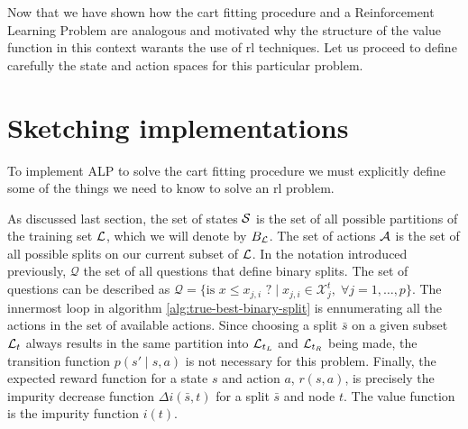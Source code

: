 
Now that we have shown how the \ac{cart} fitting procedure and a Reinforcement
Learning Problem are analogous and motivated why the structure of the value
function in this context warants the use of \ac{rl} techniques. Let us proceed
to define carefully the state and action spaces for this particular problem.

\section{Sketching implementations}

To implement ALP to solve the \ac{cart} fitting procedure we must explicitly
define some of the things we need to know to solve an \ac{rl} problem.

As discussed last section, the set of states $\mathcal{S}$ is the set of all
possible partitions of the training set $\mathcal{L}$, which we will denote by $B_{\mathcal{L}}$.
The set of actions $\mathcal{A}$ is the set of all possible splits on our current
subset of $\mathcal{L}$. In the notation introduced previously, $\mathcal{Q}$ the set of
all questions that define binary splits. The set of questions can be described
as $\mathcal{Q} = \{ \text{is } x \leq x_{j, i} \text{ ?} \mid x_{j, i} \in
\mathcal{X}_{j}^{t}, \; \forall j = 1, \dots, p \}$.  The innermost loop in
algorithm \ref{alg:true-best-binary-split} is ennumerating all the actions in
the set of available actions. Since choosing a split $\bar{s}$ on a given subset
$\mathcal{L}_t$ always results in the same partition into $\mathcal{L}_{t_L}$ and $\mathcal{L}_{t_R}$ being
made, the transition function $p(s' \mid s, a)$ is not necessary for this
problem. Finally, the expected reward function for a state $s$ and action $a$,
$r(s, a)$, is precisely the impurity decrease function $\Delta i(\bar{s}, t)$
for a split $\bar{s}$ and node $t$. The value function is the impurity function
$i(t)$.

